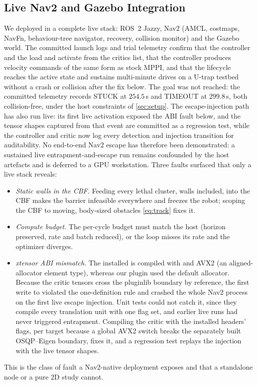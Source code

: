 \subsection{Live Nav2 and Gazebo Integration}\label{sec:live}

We deployed \sname{} in a complete live stack: ROS~2 Jazzy, Nav2 (AMCL, costmaps, NavFn, behaviour-tree navigator, recovery, collision monitor) and the Gazebo  world. The committed launch logs and trial telemetry confirm that the controller and the  load and activate from the critics list, that the controller produces velocity commands of the same form as stock MPPI, and that the lifecycle reaches the active state and sustains multi-minute drives on a U-trap testbed without a crash or collision after the fix below. The goal was not reached: the committed telemetry records STUCK at $254.5$\,s and TIMEOUT at $299.8$\,s, both collision-free, under the host constraints of \cref{sec:setup}. The escape-injection path has also run live: its first live activation exposed the ABI fault below, and the tensor shapes captured from that event are committed as a regression test, while the controller and critic now log every detection and injection transition for auditability. No end-to-end Nav2 escape has therefore been demonstrated: a sustained live entrapment-and-escape run remains confounded by the host artefacts and is deferred to a GPU workstation. Three faults surfaced that only a live stack reveals:
\begin{itemize}
    \item \emph{Static walls in the CBF.} Feeding every lethal cluster, walls included, into the CBF makes the barrier infeasible everywhere and freezes the robot; scoping the CBF to moving, body-sized obstacles \eqref{eq:track} fixes it.
    \item \emph{Compute budget.} The per-cycle budget must match the host (horizon preserved, rate and batch reduced), or the loop misses its rate and the optimizer diverges.
    \item \emph{xtensor ABI mismatch.} The installed  is compiled with  and AVX2 (an aligned-allocator element type), whereas our plugin used the default allocator. Because the critic tensors cross the pluginlib boundary by reference, the first  write to  violated the one-definition rule and crashed the whole Nav2 process on the first live escape injection. Unit tests could not catch it, since they compile every translation unit with one flag set, and earlier live runs had never triggered entrapment. Compiling the critic with the installed headers' flags, per target because a global AVX2 switch breaks the separately built OSQP--Eigen boundary, fixes it, and a regression test replays the injection with the live tensor shapes.
\end{itemize}
This is the class of fault a Nav2-native deployment exposes and that a standalone node or a pure 2D study cannot.
